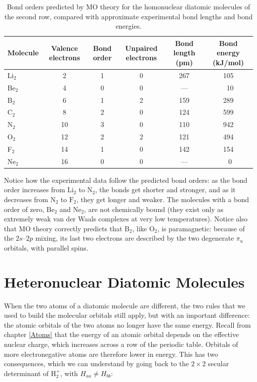 \documentclass[
  english,
  9pt,
]{extbook}
\theoremstyle{definition}
\theoremstyle{definition}
\theoremstyle{definition}
\theoremstyle{definition}
\theoremstyle{remark}
\begin{document}
\begin{table}

\caption{\label{tab:tab1c11}Bond orders predicted by MO theory for the homonuclear diatomic molecules of the second row, compared with approximate experimental bond lengths and bond energies.}
\centering
\begin{tabular}[t]{l|c|c|c|c|c}
\hline
Molecule & Valence electrons & Bond order & Unpaired electrons & Bond length (pm) & Bond energy (kJ/mol)\\
\hline
Li$_2$ & 2 & 1 & 0 & 267 & 105\\
\hline
Be$_2$ & 4 & 0 & 0 & — & ~10\\
\hline
B$_2$ & 6 & 1 & 2 & 159 & 289\\
\hline
C$_2$ & 8 & 2 & 0 & 124 & 599\\
\hline
N$_2$ & 10 & 3 & 0 & 110 & 942\\
\hline
O$_2$ & 12 & 2 & 2 & 121 & 494\\
\hline
F$_2$ & 14 & 1 & 0 & 142 & 154\\
\hline
Ne$_2$ & 16 & 0 & 0 & — & ~0\\
\hline
\end{tabular}
\end{table}

Notice how the experimental data follow the predicted bond orders: as the bond order increases from \(\mathrm{Li}_2\) to \(\mathrm{N}_2\), the bonds get shorter and stronger, and as it decreases from \(\mathrm{N}_2\) to \(\mathrm{F}_2\), they get longer and weaker. The molecules with a bond order of zero, \(\mathrm{Be}_2\) and \(\mathrm{Ne}_2\), are not chemically bound (they exist only as extremely weak van der Waals complexes at very low temperatures). Notice also that MO theory correctly predicts that \(\mathrm{B}_2\), like \(\mathrm{O}_2\), is paramagnetic: because of the \(2s\)--\(2p\) mixing, its last two electrons are described by the two degenerate \(\pi_u\) orbitals, with parallel spins.

\section{Heteronuclear Diatomic Molecules}\label{heteronuclear-diatomic-molecules}

When the two atoms of a diatomic molecule are different, the two rules that we used to build the molecular orbitals still apply, but with an important difference: the atomic orbitals of the two atoms no longer have the same energy. Recall from chapter \ref{Atoms} that the energy of an atomic orbital depends on the effective nuclear charge, which increases across a row of the periodic table. Orbitals of more electronegative atoms are therefore lower in energy. This has two consequences, which we can understand by going back to the \(2\times2\) secular determinant of \(\mathrm{H}_2^+\), with \(H_{aa}\neq H_{bb}\):
\end{document}

